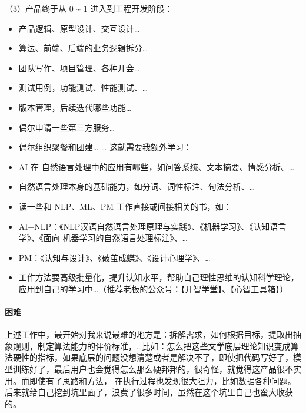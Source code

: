 \documentclass[letterpaper,11pt,english]{sphinxmanual}
\begin{document}
（3）产品终于从 0 \textasciitilde{} 1 进入到工程开发阶段：
\begin{itemize}
\item {} 
产品逻辑、原型设计、交互设计…

\item {} 
算法、前端、后端的业务逻辑拆分…

\item {} 
团队写作、项目管理、各种开会…

\item {} 
测试用例，功能测试、性能测试、…

\item {} 
版本管理，后续迭代哪些功能…

\item {} 
偶尔申请一些第三方服务…

\item {} 
偶尔组织聚餐和团建… … 这就需要我额外学习：

\item {} 
AI 在 自然语言处理中的应用有哪些，如问答系统、文本摘要、情感分析、…

\item {} 
自然语言处理本身的基础能力，如分词、词性标注、句法分析、…

\item {} 
读一些和 NLP、ML、PM 工作直接或间接相关的书，如：

\item {} 
AI+NLP：《NLP汉语自然语言处理原理与实践》、《机器学习》、《认知语言学》、《面向\sphinxhyphen{}
机器学习的自然语言处理标注》、…

\item {} 
PM：《认知与设计》、《破茧成蝶》、《设计心理学》、…

\item {} 
工作方法要高级批量化，提升认知水平，帮助自己理性思维的认知科学理论，应用到自己的学习中…（推荐老板的公众号：【开智学堂】、【心智工具箱】）

\end{itemize}


\paragraph{困难}
\label{\detokenize{chapter_experience/early_phase:id2}}
上述工作中，最开始对我来说最难的地方是：拆解需求，如何根据目标，提取出抽象规则，制定算法能力的评价标准，…比如：怎么把这些文学底层理论知识变成算法硬性的指标，如果底层的问题没想清楚或者是解决不了，即使把代码写好了，模型训练好了，最后用户也会觉得怎么那么硬邦邦的，很奇怪，就觉得这产品很不实用。而即使有了思路和方法，
在执行过程也发现很大阻力，比如数据各种问题。后来就给自己挖到坑里面了，浪费了很多时间，虽然在这个坑里自己也蛮大收获的。
\end{document}
